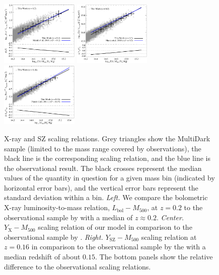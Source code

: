 \documentclass[traditabstract]{aa}
\newcommand{\rmn}{\mathrm}
\begin{document}
\begin{figure}[t]
\centering
\includegraphics[width=0.33\textwidth]{figures/lx_m.eps}
\includegraphics[width=0.33\textwidth]{figures/yx_m.eps}
\includegraphics[width=0.33\textwidth]{figures/sz_m.eps}
\caption{X-ray and SZ scaling relations. Grey triangles show the MultiDark
  sample (limited to the mass range covered by observations), the black line is
  the corresponding scaling relation, and the blue line is the
  observational result. The black crosses represent the median values of the
  quantity in question for a given mass bin (indicated by horizontal error
  bars), and the vertical error bars represent the standard deviation within a
  bin.  \emph{Left.} We compare the bolometric X-ray luminosity-to-mass
  relation, $L_{\rmn{bol}}-M_{500}$, at $z=0.2$ to the observational sample by
  \cite{2010MNRAS.406.1773M} with a median of $z \approx 0.2$. \emph{Center.}
  $Y_{\rmn{X}}-M_{500}$ scaling relation of our model in comparison to the
  observational sample by \cite{2010MNRAS.406.1773M}. \emph{Right.}
  $Y_{\rmn{SZ}}-M_{500}$ scaling relation at $z=0.16$ in comparison
  to the observational sample by the \cite{2011A&A...536A..11P} with a median
  redshift of about $0.15$. The bottom panels show the relative difference to
  the observational scaling relations. 
  }
\label{fig:X_LM}
\end{figure}
\end{document}
